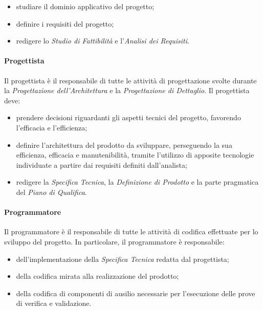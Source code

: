 			\begin{itemize}
				\item studiare il dominio applicativo del progetto;
				\item definire i requisiti del progetto;
				\item redigere lo \textit{Studio di Fattibilità} e l'\textit{Analisi dei Requisiti}.
			\end{itemize}
		
		\paragraph{Progettista}
		
			Il progettista è il responsabile di tutte le attività di progettazione svolte durante la \textit{Progettazione dell'Architettura} e la \textit{Progettazione di Dettaglio}.
			\newline
			Il progettista deve:
			
			\begin{itemize}
				\item prendere decisioni riguardanti gli aspetti tecnici del progetto, favorendo l'efficacia e l'efficienza;
				\item definire l'architettura del prodotto da sviluppare, perseguendo la sua efficienza, efficacia e manutenibilità, tramite l'utilizzo di apposite tecnologie individuate a partire dai requisiti definiti dall'analista;
				\item redigere la \textit{Specifica Tecnica}, la \textit{Definizione di Prodotto} e la parte pragmatica del \textit{Piano di Qualifica}.
			\end{itemize}
		
		\paragraph{Programmatore}
		
			Il programmatore è il responsabile di tutte le attività di codifica effettuate per lo sviluppo del progetto.
			\newline
			In particolare, il programmatore è responsabile:
			
			\begin{itemize}
				\item dell'implementazione della \textit{Specifica Tecnica} redatta dal progettista;
				\item della codifica mirata alla realizzazione del prodotto;
				\item della codifica di componenti di ausilio necessarie per l'esecuzione delle prove di verifica e validazione.
			\end{itemize}
		
